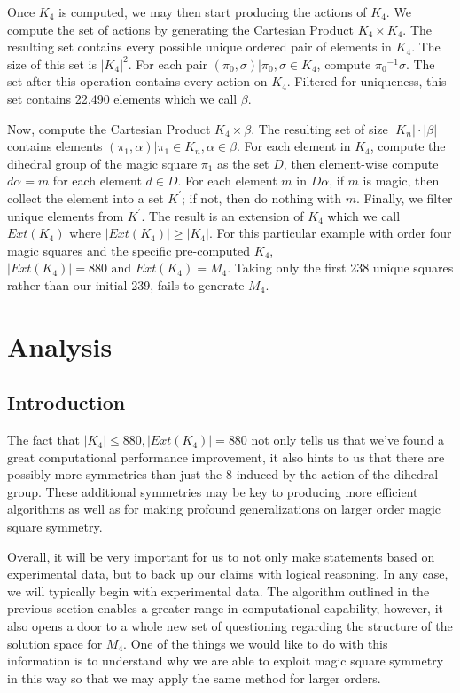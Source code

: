 \documentclass[12pt]{report}
\begin{document}
\par Once $K_4$ is computed, we may then start producing the actions of $K_4$. We compute the set
of actions by generating the Cartesian Product $K_4 \times K_4$. The resulting set contains every
possible unique ordered pair of elements in $K_4$. The size of this set is $\left|K_4\right|^2$.
For each pair $\left(\pi_0,\sigma\right)\vert \pi_0,\sigma\in K_4$, compute ${\pi_0}^{-1}\sigma$. The set
after
this operation contains every action on $K_4$. Filtered for uniqueness, this set contains 22,490
elements which we call $\beta$.

\par Now, compute the Cartesian Product $K_4 \times \beta$. The resulting set of size $\left|K_n
  \right|\cdot \left|\beta \right|$ contains elements $\left(\pi_1, \alpha\right)\vert \pi_1\in
  K_n, \alpha\in \beta$.
For each element in $K_4$, compute the dihedral group of the magic square $\pi_1$ as the set $D$, then
element-wise compute $d\alpha=m$ for each element $d\in D$. For each element $m$ in $D\alpha$, if
$m$ is
magic, then collect the element into a set $K^\prime$; if not, then do nothing with $m$. Finally,
we filter unique elements from $K^\prime$. The result is an extension of $K_4$ which we call
$Ext\left(K_4\right)$ where $\left|Ext\left(K_4\right) \right|\geq \left|K_4 \right|$. For this
particular example with order four magic squares and the specific pre-computed $K_4$,
$\left|Ext\left(K_4\right) \right|=880 \text{ and } Ext\left(K_4\right)=M_4$. Taking only the first
238 unique squares rather than our initial 239, fails to generate $M_4$.

\chapter{Analysis}

\section{Introduction} The fact that $\left|K_4\right|\leq 880, \left|Ext\left(K_4
  \right)\right|=880$ not only tells us that we've found a great computational performance
improvement, it also hints to us that there are possibly more symmetries than just the 8 induced by
the action of the dihedral group. These additional symmetries may be key to producing more
efficient algorithms as well as for making profound generalizations on larger order magic square
symmetry.

\par Overall, it will be very important for us to not only make statements based on experimental
data, but to back up our claims with logical reasoning. In any case, we will typically begin with
experimental data. The algorithm outlined in the previous section enables a greater range in
computational capability, however, it also opens a door to a whole new set of questioning regarding
the structure of the solution space for $M_4$. One of the things we would like to do with this
information is to understand why we are able to exploit magic square symmetry in this way so that
we may apply the same method for larger orders.
\end{document}
